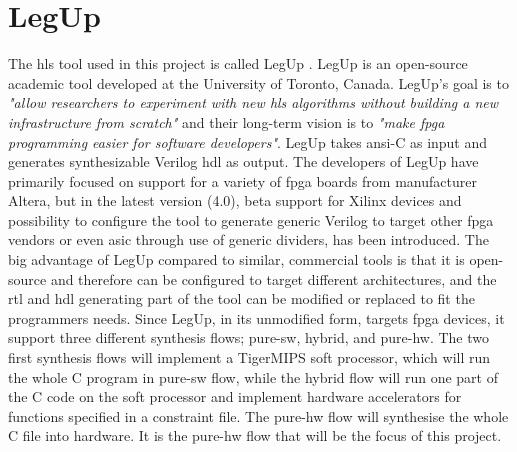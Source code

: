 \section{LegUp}
The \gls{hls} tool used in this project is called LegUp \cite{canis2011legup}. LegUp is an open-source academic tool developed at the University of Toronto, Canada. LegUp's goal is to \textit{"allow researchers to experiment with new \gls{hls} algorithms without building a new infrastructure from scratch"} and their long-term vision is to \textit{"make \gls{fpga} programming easier for software developers"}. LegUp takes \gls{ansi}-C as input and generates synthesizable Verilog \gls{hdl} as output. The developers of LegUp have primarily focused on support for a variety of \gls{fpga} boards from manufacturer Altera, but in the latest version (4.0), beta support for Xilinx devices and possibility to configure the tool to generate generic Verilog to target other \gls{fpga} vendors or even \gls{asic} through use of generic dividers, has been introduced. The big advantage of LegUp compared to similar, commercial tools is that it is open-source and therefore can be configured to target different architectures, and the \gls{rtl} and \gls{hdl} generating part of the tool can be modified or replaced to fit the programmers needs.
Since LegUp, in its unmodified form, targets \gls{fpga} devices, it support three different synthesis flows; pure-\gls{sw}, hybrid, and pure-\gls{hw}. The two first synthesis flows will implement a TigerMIPS \cite{tigmips} soft processor, which will run the whole C program in pure-\gls{sw} flow, while the hybrid flow will run one part of the C code on the soft processor and implement hardware accelerators for functions specified in a constraint file. The pure-\gls{hw} flow will synthesise the whole C file into hardware. It is the pure-\gls{hw} flow that will be the focus of this project.

